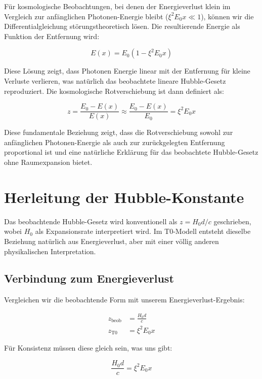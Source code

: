 \documentclass[12pt,a4paper]{article}
\begin{document}
	Für kosmologische Beobachtungen, bei denen der Energieverlust klein im Vergleich zur anfänglichen Photonen-Energie bleibt ($\xi^2 E_0 x \ll 1$), können wir die Differentialgleichung störungstheoretisch lösen. Die resultierende Energie als Funktion der Entfernung wird:
	
	\begin{equation}
		E(x) = E_0 \left(1 - \xi^2 E_0 x\right)
	\end{equation}
	
	Diese Lösung zeigt, dass Photonen Energie linear mit der Entfernung für kleine Verluste verlieren, was natürlich das beobachtete lineare Hubble-Gesetz reproduziert. Die kosmologische Rotverschiebung ist dann definiert als:
	
	\begin{equation}
		z = \frac{E_0 - E(x)}{E(x)} \approx \frac{E_0 - E(x)}{E_0} = \xi^2 E_0 x
	\end{equation}
	
	Diese fundamentale Beziehung zeigt, dass die Rotverschiebung sowohl zur anfänglichen Photonen-Energie als auch zur zurückgelegten Entfernung proportional ist und eine natürliche Erklärung für das beobachtete Hubble-Gesetz ohne Raumexpansion bietet.
	
	\section{Herleitung der Hubble-Konstante}
	
	Das beobachtende Hubble-Gesetz wird konventionell als $z = H_0 d/c$ geschrieben, wobei $H_0$ als Expansionsrate interpretiert wird. Im T0-Modell entsteht dieselbe Beziehung natürlich aus Energieverlust, aber mit einer völlig anderen physikalischen Interpretation.
	
	\subsection{Verbindung zum Energieverlust}
	
	Vergleichen wir die beobachtende Form mit unserem Energieverlust-Ergebnis:
	
	\begin{align}
		z_{\text{beob}} &= \frac{H_0 d}{c} \\
		z_{\text{T0}} &= \xi^2 E_0 x
	\end{align}
	
	Für Konsistenz müssen diese gleich sein, was uns gibt:
	
	\begin{equation}
		\frac{H_0 d}{c} = \xi^2 E_0 x
	\end{equation}
	
\end{document}
